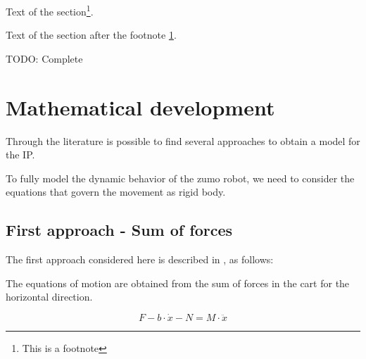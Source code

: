 \documentclass{article}
\begin{document}

Text of the section\footnote{\label{fn1}This is a footnote}.

Text of the section after the footnote \ref{fn1}.

TODO: Complete

\section{Mathematical development}

Through the literature is possible to find several approaches to obtain a model for the IP.

To fully model the dynamic behavior of the zumo robot, we need to consider the equations that govern the movement as rigid body.

\subsection{First approach - Sum of forces}

The first approach considered here is described in \cite{SUL03}, as follows:

The equations of motion are obtained from the sum of forces in the cart for the horizontal direction.

\begin{equation} \label{sfch}
F-b\cdot \dot{x}-N=M\cdot \ddot{x}
\end{equation}
\end{document}
